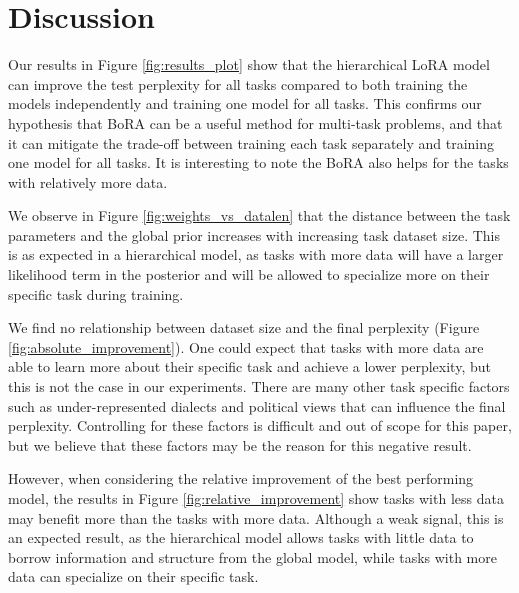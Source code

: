 \documentclass{article}
\begin{document}
\section{Discussion}
Our results in Figure \ref{fig:results_plot} show that the hierarchical LoRA model can improve the test perplexity for all tasks compared to both training the models independently and training one model for all tasks. This confirms our hypothesis that BoRA can be a useful method for multi-task problems, and that it can mitigate the trade-off between training each task separately and training one model for all tasks.
It is interesting to note the BoRA also helps for the tasks with relatively more data.

We observe in Figure \ref{fig:weights_vs_datalen} that the distance between the task parameters and the global prior increases with increasing task dataset size. This is as expected in a hierarchical model, as tasks with more data will have a larger likelihood term in the posterior and will be allowed to specialize more on their specific task during training.

We find no relationship between dataset size and the final perplexity (Figure \ref{fig:absolute_improvement}). One could expect that tasks with more data are able to learn more about their specific task and achieve a lower perplexity, but this is not the case in our experiments. There are many other task specific factors such as under-represented dialects and political views that can influence the final perplexity. Controlling for these factors is difficult and out of scope for this paper, but we believe that these factors may be the reason for this negative result.

However, when considering the relative improvement of the best performing model, the results in Figure \ref{fig:relative_improvement} show tasks with less data may benefit more than the tasks with more data. Although a weak signal, this is an expected result, as the hierarchical model allows tasks with little data to borrow information and structure from the global model, while tasks with more data can specialize on their specific task.
\end{document}
